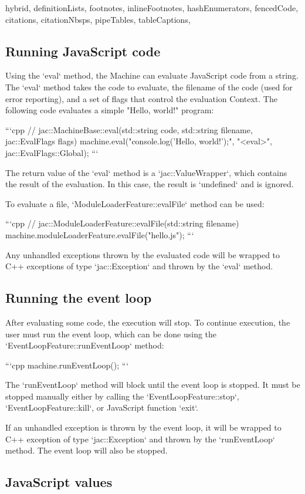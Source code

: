 \begin{markdown*}{%
  hybrid,
  definitionLists,
  footnotes,
  inlineFootnotes,
  hashEnumerators,
  fencedCode,
  citations,
  citationNbsps,
  pipeTables,
  tableCaptions,
}
\subsection{Running JavaScript code}

Using the `eval` method, the Machine can evaluate JavaScript code from a string. The `eval` method takes the code to evaluate, the filename of the code (used for error reporting), and a set of flags that control the evaluation Context. The following code evaluates a simple "Hello, world!" program:

```cpp
// jac::MachineBase::eval(std::string code, std::string filename, jac::EvalFlags flags)
machine.eval("console.log('Hello, world!');", "<eval>", jac::EvalFlags::Global);
```

The return value of the `eval` method is a `jac::ValueWrapper`, which contains the result of the evaluation. In this case, the result is `undefined` and is ignored.

To evaluate a file, `ModuleLoaderFeature::evalFile` method can be used:

```cpp
// jac::ModuleLoaderFeature::evalFile(std::string filename)
machine.moduleLoaderFeature.evalFile("hello.js");
```

Any unhandled exceptions thrown by the evaluated code will be wrapped to C++ exceptions of type `jac::Exception` and thrown by the `eval` method.

\subsection{Running the event loop}

After evaluating some code, the execution will stop. To continue execution, the user must run the event loop, which can be done using the `EventLoopFeature::runEventLoop` method:

```cpp
machine.runEventLoop();
```

The `runEventLoop` method will block until the event loop is stopped. It must be stopped manually either by calling the `EventLoopFeature::stop`, `EventLoopFeature::kill`, or JavaScript function `exit`.

If an unhandled exception is thrown by the event loop, it will be wrapped to C++ exception of type `jac::Exception` and thrown by the `runEventLoop` method. The event loop will also be stopped.

\subsection{JavaScript values}


\end{markdown*}

